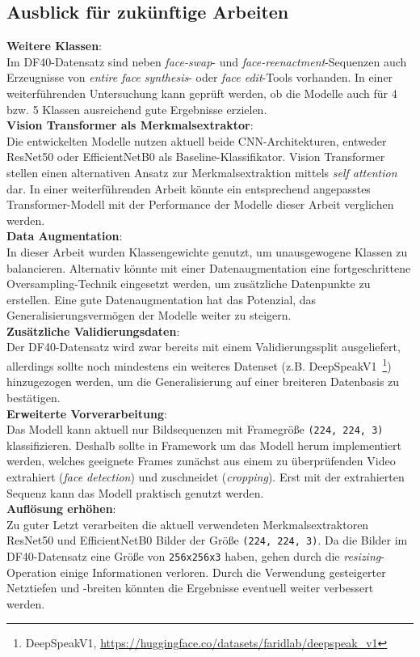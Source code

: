 \documentclass{article}
\newcommand{\imgsize}{\texttt{(224, 224, 3)}\xspace}
\newcommand{\resnet}{ResNet50\xspace}
\newcommand{\effnet}{EfficientNetB0\xspace}
\begin{document}
\subsection{Ausblick für zukünftige Arbeiten}
\textbf{Weitere Klassen}:\\
Im DF40-Datensatz sind neben \textit{face-swap}- und \textit{face-reenactment}-Sequenzen auch Erzeugnisse von \textit{entire face synthesis}- oder \textit{face edit}-Tools vorhanden.
In einer weiterführenden Untersuchung kann geprüft werden, ob die Modelle auch für 4 bzw. 5 Klassen ausreichend gute Ergebnisse erzielen.
\\[0.5em]
\textbf{Vision Transformer als Merkmalsextraktor}:\\
Die entwickelten Modelle nutzen aktuell beide CNN-Architekturen, entweder \resnet oder \effnet als Baseline-Klassifikator.
Vision Transformer stellen einen alternativen Ansatz zur Merkmalsextraktion mittels \textit{self attention} dar.
In einer weiterführenden Arbeit könnte ein entsprechend angepasstes Transformer-Modell mit der Performance der Modelle dieser Arbeit verglichen werden.  
\\[0.5em]
\textbf{Data Augmentation}:\\
In dieser Arbeit wurden Klassengewichte genutzt, um unausgewogene Klassen zu balancieren.
Alternativ könnte mit einer Datenaugmentation eine fortgeschrittene Oversampling-Technik eingesetzt werden, um zusätzliche Datenpunkte zu erstellen.
Eine gute Datenaugmentation hat das Potenzial, das Generalisierungsvermögen der Modelle weiter zu steigern.
\\[0.5em]
\textbf{Zusätzliche Validierungsdaten}:\\
Der DF40-Datensatz wird zwar bereits mit einem Validierungssplit ausgeliefert, allerdings sollte noch mindestens ein weiteres Datenset (z.B. DeepSpeakV1~\footnote{DeepSpeakV1, \url{https://huggingface.co/datasets/faridlab/deepspeak_v1}}) hinzugezogen werden, um die Generalisierung auf einer breiteren Datenbasis zu bestätigen.
\\[0.5em]
\textbf{Erweiterte Vorverarbeitung}:\\
Das Modell kann aktuell nur Bildsequenzen mit Framegröße \imgsize klassifizieren.
Deshalb sollte in Framework um das Modell herum implementiert werden, welches geeignete Frames zunächst aus einem zu überprüfenden Video extrahiert (\textit{face detection}) und zuschneidet (\textit{cropping}).
Erst mit der extrahierten Sequenz kann das Modell praktisch genutzt werden.
\\[0.5em]
\textbf{Auflösung erhöhen}:\\
Zu guter Letzt verarbeiten die aktuell verwendeten Merkmalsextraktoren \resnet und \effnet Bilder der Größe \imgsize.
Da die Bilder im DF40-Datensatz eine Größe von \texttt{256x256x3} haben, gehen durch die \textit{resizing}-Operation einige Informationen verloren.
Durch die Verwendung gesteigerter Netztiefen und -breiten könnten die Ergebnisse eventuell weiter verbessert werden.
\end{document}
